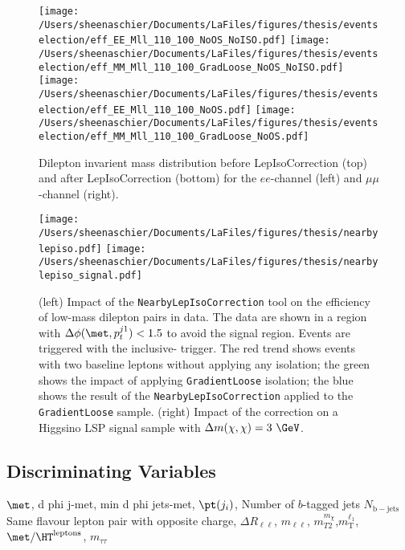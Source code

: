 \documentclass[11pt, oneside]{article}   	%
\begin{document}
  \begin{figure}[tbp]
     \texttt{[image: /Users/sheenaschier/Documents/LaFiles/figures/thesis/eventselection/eff\_EE\_Mll\_110\_100\_NoOS\_NoISO.pdf]}
       \texttt{[image: /Users/sheenaschier/Documents/LaFiles/figures/thesis/eventselection/eff\_MM\_Mll\_110\_100\_GradLoose\_NoOS\_NoISO.pdf]}\\
     \texttt{[image: /Users/sheenaschier/Documents/LaFiles/figures/thesis/eventselection/eff\_EE\_Mll\_110\_100\_NoOS.pdf]}
     \texttt{[image: /Users/sheenaschier/Documents/LaFiles/figures/thesis/eventselection/eff\_MM\_Mll\_110\_100\_GradLoose\_NoOS.pdf]}\\
   \caption{Dilepton invarient mass distribution before LepIsoCorrection (top) and after LepIsoCorrection (bottom) for the $ee$-channel (left) and $\mu\mu$-channel (right).}
   \label{fig:EffMll_ISOCorr}
 \end{figure}

 \begin{figure}[tbp]
  \texttt{[image: /Users/sheenaschier/Documents/LaFiles/figures/thesis/nearbylepiso.pdf]}
   \texttt{[image: /Users/sheenaschier/Documents/LaFiles/figures/thesis/nearbylepiso\_signal.pdf]}
  \caption{(left) Impact of the \texttt{NearbyLepIsoCorrection} tool on the efficiency of low-mass dilepton pairs in data.  The data are shown in a region with $\Delta\phi(\met, p_{t}^{j1})<1.5$ to avoid the signal region.  Events are triggered with the inclusive-\met{} trigger.  The red trend shows events with two baseline leptons without applying any isolation; the green shows the impact of applying \texttt{GradientLoose} isolation; the blue shows the result of the \texttt{NearbyLepIsoCorrection} applied to the \texttt{GradientLoose} sample.  (right) Impact of the correction on a Higgsino LSP signal sample with $\Delta m(\chi,\chi)=3~\GeV$.}
 \label{fig:nearbylepiso}
 \end{figure}


\subsection{Discriminating Variables}
\label{sec:discvar}
$\met$, d phi j-met, min d phi jets-met, $\pt(j_i)$, Number of $b$-tagged jets $N_\mathrm{b-jets}$\\
Same flavour lepton pair with opposite charge, $\Delta R_{\ell\ell}$, $m_{\ell\ell}$, $m_{T2}^{m_{\chi}}$,$m_\text{T}^{\ell_1}$, $\met/\HT^\text{leptons}$, $m_{\tau\tau}$
\end{document}
